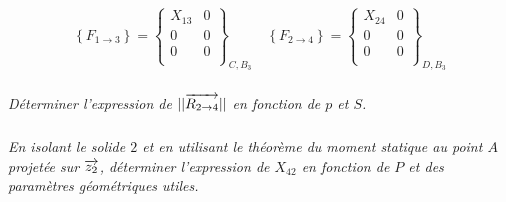 \documentclass[10pt,fleqn]{article} %
\begin{document}
\begin{multicols}{2}
{\begin{corrige}
$$
\left\{
F_{1 \rightarrow 3} 
\right\}=
\left\{
\begin{array}{cc}
X_{13} & 0 \\
0 & 0 \\
0 & 0 \\
\end{array}
\right\}_{C,B_3}
\quad 
\left\{
F_{2 \rightarrow 4} 
\right\}=
\left\{
\begin{array}{cc}
X_{24} & 0 \\
0 & 0 \\
0 & 0 \\
\end{array}
\right\}_{D,B_3}
$$
\end{corrige}}{}

\subparagraph{}
\textit{Déterminer l'expression de $||\overrightarrow{R_{2\rightarrow 4}}||$ en fonction de $p$ et $S$.}

\subparagraph{}
\textit{En isolant le solide $2$ et en utilisant le théorème du moment statique au point $A$ projetée sur $\overrightarrow{z_2}$, déterminer l'expression de $X_{42}$ en fonction de $P$ et des paramètres géométriques utiles.}
\end{multicols}
\end{document}
